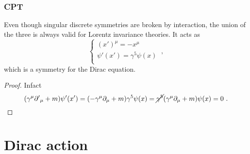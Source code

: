 \subsection{CPT}

    Even though singular discrete symmetries are broken by interaction, the union of the three is always valid for Lorentz invariance theories. It acts as 
    \begin{equation*}
        \begin{cases}
            (x')^\mu = - x^\mu \\
            \psi'(x') = \gamma^5 \psi(x) \\
        \end{cases} ~,
    \end{equation*}
    which is a symmetry for the Dirac equation.
    \begin{proof}
        Infact 
        \begin{equation*}
            (\gamma^\mu {\partial'}_\mu + m) \psi'(x') = (- \gamma^\mu \partial_\mu + m) \gamma^5 \psi(x) = \cancel{\gamma^5} (\gamma^\mu \partial_\mu + m) \psi (x) = 0 ~.
        \end{equation*}
    \end{proof}


\chapter{Dirac action} 